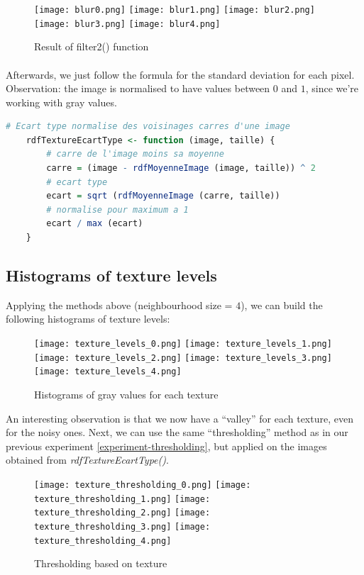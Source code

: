\begin{figure}[h]
    \centering
    \texttt{[image: blur0.png]}
    \texttt{[image: blur1.png]}
    \texttt{[image: blur2.png]}
    \texttt{[image: blur3.png]}
    \texttt{[image: blur4.png]}
    \caption{Result of filter2() function}
    \label{}
\end{figure}

\clearpage

\paragraph{}
Afterwards, we just follow the formula for the standard deviation for each pixel.
Observation: the image is normalised to have values between $0$ and $1$, since we're working with gray values.

\begin{lstlisting}[language=R, caption=Calculating a pixel's average value]
    # Ecart type normalise des voisinages carres d'une image
    rdfTextureEcartType <- function (image, taille) {
        # carre de l'image moins sa moyenne
        carre = (image - rdfMoyenneImage (image, taille)) ^ 2
        # ecart type
        ecart = sqrt (rdfMoyenneImage (carre, taille))
        # normalise pour maximum a 1
        ecart / max (ecart)
    }
\end{lstlisting}

\subsection{Histograms of texture levels}
Applying the methods above (neighbourhood size = $4$), we can build the following histograms of texture levels:
\begin{figure}[h]
    \centering
    \texttt{[image: texture\_levels\_0.png]}
    \texttt{[image: texture\_levels\_1.png]}
    \texttt{[image: texture\_levels\_2.png]}
    \texttt{[image: texture\_levels\_3.png]}
    \texttt{[image: texture\_levels\_4.png]}
    \caption{Histograms of gray values for each texture}
    \label{}
\end{figure}

\clearpage

An interesting observation is that we now have a ``valley'' for each texture, even for the noisy ones.
Next, we can use the same ``thresholding'' method as in our previous experiment \ref{experiment-thresholding}, but applied on the images obtained from \emph{rdfTextureEcartType()}.
\begin{figure}[h]
    \centering
    \texttt{[image: texture\_thresholding\_0.png]}
    \texttt{[image: texture\_thresholding\_1.png]}
    \texttt{[image: texture\_thresholding\_2.png]}
    \texttt{[image: texture\_thresholding\_3.png]}
    \texttt{[image: texture\_thresholding\_4.png]}
    \caption{Thresholding based on texture}
\end{figure}

